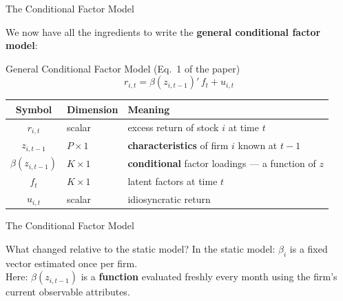 \documentclass[aspectratio=169, 10pt]{beamer}
\begin{document}
\begin{frame}{The Conditional Factor Model}

We now have all the ingredients to write the \textbf{general conditional factor model}:

\bigskip
\begin{alertblock}{General Conditional Factor Model (Eq.\ 1 of the paper)}
$$r_{i,t} = \beta(z_{i,t-1})'\, f_t + u_{i,t}$$
\end{alertblock}

\bigskip
\begin{center}
\begin{tabular}{cll}
\toprule
\textbf{Symbol} & \textbf{Dimension} & \textbf{Meaning} \\
\midrule
$r_{i,t}$         & scalar   & excess return of stock $i$ at time $t$ \\
$z_{i,t-1}$       & $P\times 1$ & \textbf{characteristics} of firm $i$ known at $t-1$ \\
$\beta(z_{i,t-1})$& $K\times 1$ & \textbf{conditional} factor loadings — a function of $z$ \\
$f_t$             & $K\times 1$ & latent factors at time $t$ \\
$u_{i,t}$         & scalar   & idiosyncratic return \\
\bottomrule
\end{tabular}
\end{center}
\end{frame}
%
%
\begin{frame}{The Conditional Factor Model}
\begin{exampleblock}{What changed relative to the static model?}
In the static model: $\beta_i$ is a fixed vector estimated once per firm.\\
Here: $\beta(z_{i,t-1})$ is a \textbf{function} evaluated freshly every month
using the firm's current observable attributes.
\end{exampleblock}

\end{frame}
%
%
\end{document}
